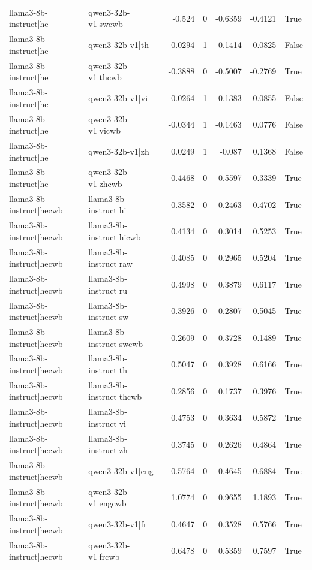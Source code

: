 \begin{table}
\begin{tabular}{l l r r r r l}
llama3-8b-instruct|he & qwen3-32b-v1|swcwb & -0.524 & 0 & -0.6359 & -0.4121 & True \\
llama3-8b-instruct|he & qwen3-32b-v1|th & -0.0294 & 1 & -0.1414 & 0.0825 & False \\
llama3-8b-instruct|he & qwen3-32b-v1|thcwb & -0.3888 & 0 & -0.5007 & -0.2769 & True \\
llama3-8b-instruct|he & qwen3-32b-v1|vi & -0.0264 & 1 & -0.1383 & 0.0855 & False \\
llama3-8b-instruct|he & qwen3-32b-v1|vicwb & -0.0344 & 1 & -0.1463 & 0.0776 & False \\
llama3-8b-instruct|he & qwen3-32b-v1|zh & 0.0249 & 1 & -0.087 & 0.1368 & False \\
llama3-8b-instruct|he & qwen3-32b-v1|zhcwb & -0.4468 & 0 & -0.5597 & -0.3339 & True \\
llama3-8b-instruct|hecwb & llama3-8b-instruct|hi & 0.3582 & 0 & 0.2463 & 0.4702 & True \\
llama3-8b-instruct|hecwb & llama3-8b-instruct|hicwb & 0.4134 & 0 & 0.3014 & 0.5253 & True \\
llama3-8b-instruct|hecwb & llama3-8b-instruct|raw & 0.4085 & 0 & 0.2965 & 0.5204 & True \\
llama3-8b-instruct|hecwb & llama3-8b-instruct|ru & 0.4998 & 0 & 0.3879 & 0.6117 & True \\
llama3-8b-instruct|hecwb & llama3-8b-instruct|sw & 0.3926 & 0 & 0.2807 & 0.5045 & True \\
llama3-8b-instruct|hecwb & llama3-8b-instruct|swcwb & -0.2609 & 0 & -0.3728 & -0.1489 & True \\
llama3-8b-instruct|hecwb & llama3-8b-instruct|th & 0.5047 & 0 & 0.3928 & 0.6166 & True \\
llama3-8b-instruct|hecwb & llama3-8b-instruct|thcwb & 0.2856 & 0 & 0.1737 & 0.3976 & True \\
llama3-8b-instruct|hecwb & llama3-8b-instruct|vi & 0.4753 & 0 & 0.3634 & 0.5872 & True \\
llama3-8b-instruct|hecwb & llama3-8b-instruct|zh & 0.3745 & 0 & 0.2626 & 0.4864 & True \\
llama3-8b-instruct|hecwb & qwen3-32b-v1|eng & 0.5764 & 0 & 0.4645 & 0.6884 & True \\
llama3-8b-instruct|hecwb & qwen3-32b-v1|engcwb & 1.0774 & 0 & 0.9655 & 1.1893 & True \\
llama3-8b-instruct|hecwb & qwen3-32b-v1|fr & 0.4647 & 0 & 0.3528 & 0.5766 & True \\
llama3-8b-instruct|hecwb & qwen3-32b-v1|frcwb & 0.6478 & 0 & 0.5359 & 0.7597 & True \\

\end{tabular}
\end{table}
